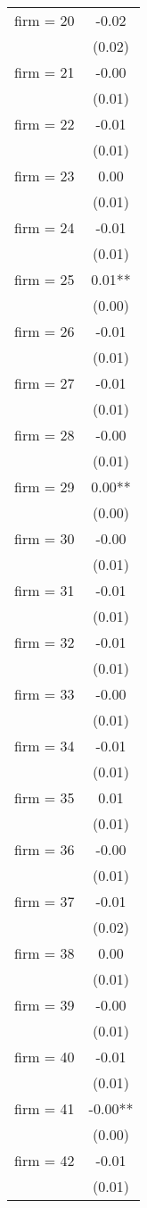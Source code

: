\begin{tabular}{lc}
firm = 20 & -0.02 \\
 & (0.02) \\
firm = 21 & -0.00 \\
 & (0.01) \\
firm = 22 & -0.01 \\
 & (0.01) \\
firm = 23 & 0.00 \\
 & (0.01) \\
firm = 24 & -0.01 \\
 & (0.01) \\
firm = 25 & 0.01** \\
 & (0.00) \\
firm = 26 & -0.01 \\
 & (0.01) \\
firm = 27 & -0.01 \\
 & (0.01) \\
firm = 28 & -0.00 \\
 & (0.01) \\
firm = 29 & 0.00** \\
 & (0.00) \\
firm = 30 & -0.00 \\
 & (0.01) \\
firm = 31 & -0.01 \\
 & (0.01) \\
firm = 32 & -0.01 \\
 & (0.01) \\
firm = 33 & -0.00 \\
 & (0.01) \\
firm = 34 & -0.01 \\
 & (0.01) \\
firm = 35 & 0.01 \\
 & (0.01) \\
firm = 36 & -0.00 \\
 & (0.01) \\
firm = 37 & -0.01 \\
 & (0.02) \\
firm = 38 & 0.00 \\
 & (0.01) \\
firm = 39 & -0.00 \\
 & (0.01) \\
firm = 40 & -0.01 \\
 & (0.01) \\
firm = 41 & -0.00** \\
 & (0.00) \\
firm = 42 & -0.01 \\
 & (0.01) \\

\end{tabular}
